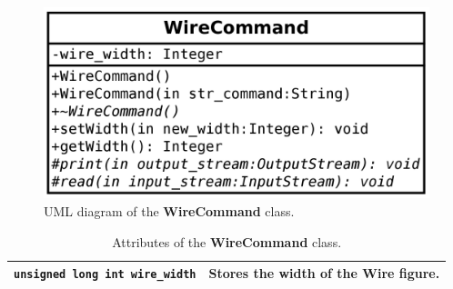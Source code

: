 \documentclass[11pt,twoside,openany,x11names,svgnames]{memoir}
\begin{document}
\begin{figure}
	\centering
	\includegraphics[scale=0.2, clip=true, trim= 0pt 0pt 0pt 0pt]{images/chapter03-image20}
	\caption{UML diagram of the \textbf{WireCommand} class.}
	\label{fig:class-wire-command}
\end{figure}

\begin{table}[h]\footnotesize
\centering
\begin{tabular}{| >{\bfseries}p{6.5cm} | p{9cm} |}
	\hline
	
	\texttt{unsigned long int wire\_width} & Stores the width of the Wire figure. \\

	\hline
\end{tabular}
\caption{Attributes of the \textbf{WireCommand} class.}
\label{tab:WireCommand-Attributes}
\end{table}
\end{document}
